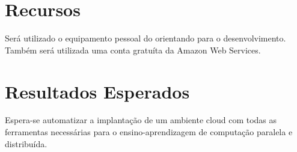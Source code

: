 \documentclass[12pt]{article}
\begin{document}
\section{Recursos}
Será utilizado o equipamento pessoal do orientando para o desenvolvimento. Também será utilizada uma conta gratuíta da Amazon Web Services.

\section{Resultados Esperados}
Espera-se automatizar a implantação de um ambiente cloud com todas as ferramentas necessárias para o ensino-aprendizagem de computação paralela e distribuída.



\end{document}
